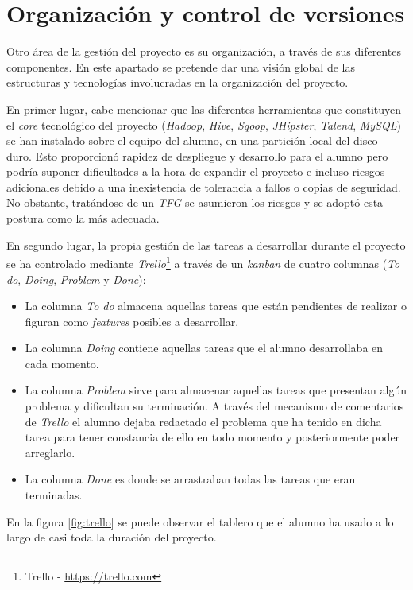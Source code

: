 \section{Organización y control de versiones} \label{gestion.organizacion}
Otro área de la gestión del proyecto es su organización, a través de sus diferentes componentes. En este apartado se pretende dar una visión global de las estructuras y tecnologías involucradas en la organización del proyecto. 
\par En primer lugar, cabe mencionar que las diferentes herramientas que constituyen el \textit{core }tecnológico del proyecto (\textit{Hadoop}, \textit{Hive}, \textit{Sqoop}, \textit{JHipster}, \textit{Talend}, \textit{MySQL}) se han instalado sobre el equipo del alumno, en una partición local del disco duro. Esto proporcionó rapidez de despliegue y desarrollo para el alumno pero podría suponer dificultades a la hora de expandir el proyecto e incluso riesgos adicionales debido a una inexistencia de tolerancia a fallos o copias de seguridad. No obstante, tratándose de un \textit{TFG} se asumieron los riesgos y se adoptó esta postura como la más adecuada. 
\par En segundo lugar, la propia gestión de las tareas a desarrollar durante el proyecto se ha controlado mediante \textit{Trello}\footnote{Trello - \url{https://trello.com}} a través de un \textit{\gls{kanban}} de cuatro columnas (\textit{To do}, \textit{Doing}, \textit{Problem} y \textit{Done}): 
\begin{itemize}
\item La columna \textit{To do} almacena aquellas tareas que están pendientes de realizar o figuran como \textit{features} posibles a desarrollar.
\item La columna \textit{Doing} contiene aquellas tareas que el alumno desarrollaba en cada momento.
\item La columna \textit{Problem} sirve para almacenar aquellas tareas que presentan algún problema y dificultan su terminación. A través del mecanismo de comentarios de \textit{Trello} el alumno dejaba redactado el problema que ha tenido en dicha tarea para tener constancia de ello en todo momento y posteriormente poder arreglarlo. 
\item La columna \textit{Done} es donde se arrastraban todas las tareas que eran terminadas.
\end{itemize} 
En la figura \ref{fig:trello} se puede observar el tablero que el alumno ha usado a lo largo de casi toda la duración del proyecto.

